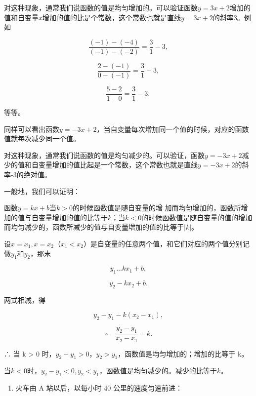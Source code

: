 对这种现象，通常我们说函数的值是均匀增加的。可以验证函数\(y = 3x + 2\)增加的值和自变量\(x\)增加的值的比是个常数，这个常数也就是直线\(y = 3x + 2\)的斜率3。例如

\[
\frac{(- 1) - (- 4)}{(- 1) - (- 2)} = \frac{3}{1} - 3,
\]

\[
\frac{2 - (- 1)}{0 - (- 1)} = \frac{3}{1} - 3,
\]

\[
\frac{5 - 2}{1 - 0} = \frac{3}{1} - 3,
\]

等等。

同样可以看出函数\(y = -3x + 2\)，当自变量每次增加同一个值的时候，对应的函数值就每次减少同一个值。

{\centering
\small\setlength{\tabcolsep}{3pt}%
\par
}

对这种现象，通常我们说函数的值是均匀减少的。可以验证，函数\(y = -3x + 2\)减少的值和自变量增加的值比起是一个常数，这个常数也就是直线\(y = -3x + 2\)的斜率-3的绝对值。

一般地，我们可以证明：

函数\(y = kx + b\)当\(k > 0\)的时候函数值是随自变量的增
加而均匀增加的，函数所增加的值与自变量增加的值的比等于\(k\)；当\(k < 0\)的时候函数值是随自变量的值的增加而均匀减少的，函数所减少的值与自变量增加的值的比等于\(|k|\)。

设\(x = x_{1}, x = x_{2}\)（\(x_{1} < x_{2}\)）是自变量的任意两个值，和它们对应的两个值分别记做\(y_{1}\)和\(y_{2}\)，那末

\[
y_{1} \dots k x_{1} + b,
\]

\[
y_{2} - k x_{2} + b.
\]

两式相减，得

\[
y_{2} - y_{1} - k (x_{2} - x_{1}),
\]

\[
\therefore \quad \frac{y_{2} - y_{1}}{x_{2} - x_{1}} - k.
\]

∴ 当 k \textgreater{} 0
时，\(y_{2} - y_{1} > 0\)，\(y_{2} > y_{1}\)，函数值是均匀增加的；增加的比等于
k。

当\(k < 0\)时，\(y_{2} - y_{1} < 0, y_{2} < y_{1}\)，函数值是均匀减少的。减少的比等于\(k\)。

\begin{enumerate}
\item
  火车由 A 站以后，以每小时 40 公里的速度匀速前进：
\end{enumerate}

